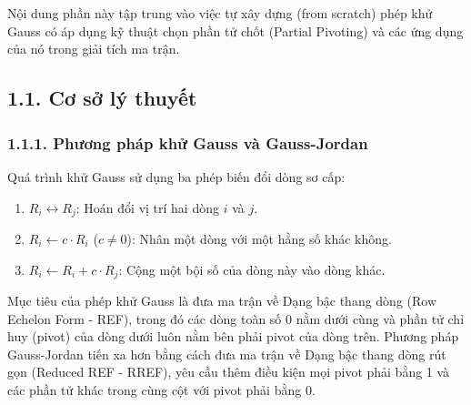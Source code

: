 


\newpage
\chapter*{}
{}

Nội dung phần này tập trung vào việc tự xây dựng (from scratch) phép khử Gauss có áp dụng kỹ thuật chọn phần tử chốt (Partial Pivoting) và các ứng dụng của nó trong giải tích ma trận.

\section*{1.1. Cơ sở lý thuyết}
{}

\subsection*{1.1.1. Phương pháp khử Gauss và Gauss-Jordan}
{}


Quá trình khử Gauss sử dụng ba phép biến đổi dòng sơ cấp:
\begin{enumerate}
    \item $R_{i} \leftrightarrow R_{j}$: Hoán đổi vị trí hai dòng $i$ và $j$.
    \item $R_{i} \leftarrow c \cdot R_{i}$ ($c \neq 0$): Nhân một dòng với một hằng số khác không.
    \item $R_{i} \leftarrow R_{i} + c \cdot R_{j}$: Cộng một bội số của dòng này vào dòng khác.
\end{enumerate}

Mục tiêu của phép khử Gauss là đưa ma trận về Dạng bậc thang dòng (Row Echelon Form - REF), trong đó các dòng toàn số 0 nằm dưới cùng và phần tử chỉ huy (pivot) của dòng dưới luôn nằm bên phải pivot của dòng trên. Phương pháp Gauss-Jordan tiến xa hơn bằng cách đưa ma trận về Dạng bậc thang dòng rút gọn (Reduced REF - RREF), yêu cầu thêm điều kiện mọi pivot phải bằng 1 và các phần tử khác trong cùng cột với pivot phải bằng 0.

